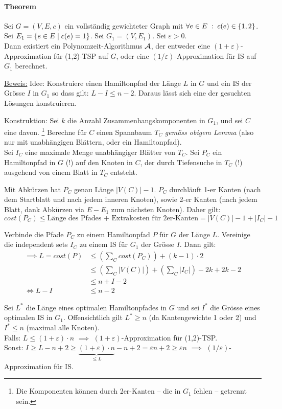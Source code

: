 \paragraph{Theorem}
Sei $G =(V,E,c)$ ein vollständig gewichteter Graph mit $\forall e \in E \; : \; c(e) \in \{1,2\}$.
Sei $E_1 = \{e \in E \; | \; c(e) = 1 \}$. Sei $G_1=(V,E_1)$.
Sei $\varepsilon > 0$.
\\
Dann existiert ein Polynomzeit-Algorithmus $\mathcal{A}$, der entweder eine $(1+\varepsilon)$-Approximation für (1,2)-TSP auf $G$,
oder eine $(1/\varepsilon)$-Approximation für IS auf $G_1$ berechnet.

\underline{Beweis:}
Idee: Konstruiere einen Hamiltonpfad der Länge $L$ in $G$ und ein IS der Grösse $I$ in $G_1$ so dass gilt: $L-I \leq n-2$.
Daraus lässt sich eine der gesuchten Lösungen konstruieren.

Konstruktion: Sei $k$ die Anzahl Zusammenhangskomponenten in $G_1$, und sei $C$ eine davon.%
\footnote{Die Komponenten können durch 2er-Kanten -- die in $G_1$ fehlen -- getrennt sein.}
Berechne für $C$ einen Spannbaum $T_C$ \emph{gemäss obigem Lemma} (also nur mit unabhängigen Blättern, oder ein Hamiltonpfad).
\\
Sei $I_C$ eine maximale Menge unabhängiger Blätter von $T_C$.
Sei $P_C$ ein Hamiltonpfad in $G$ (!) auf den Knoten in $C$, der durch Tiefensuche in $T_C$ (!) ausgehend
von einem Blatt in $T_C$ entsteht.

Mit Abkürzen hat $P_C$ genau Länge $|V(C)|-1$.
$P_C$ durchläuft 1-er Kanten (nach dem Startblatt und nach jedem inneren Knoten), sowie 2-er Kanten
(nach jedem Blatt, dank Abkürzen via $E-E_1$ zum nächsten Knoten).
Daher gilt:
$$ cost(P_C) \leq \text{Länge des Pfades + Extrakosten für 2er-Kanten} = |V(C)|-1 + |I_C|-1 $$

Verbinde die Pfade $P_C$ zu einem Hamiltonpfad $P$ für $G$ der Länge $L$.
Vereinige die independent sets $I_C$ zu einem IS für $G_1$ der Grösse $I$.
Dann gilt:
\begin{align*}
\implies L = cost(P)
& \leq \left( \sum_C cost(P_C) \right) + (k-1) \cdot 2 \\
& \leq \left( \sum_C |V(C)| \right) + \left( \sum_C |I_C| \right) - 2k + 2k - 2 \\
& \leq n + I - 2 \\
\iff L - I & \leq n-2
\end{align*}

Sei $L^*$ die Länge eines optimalen Hamiltonpfades in $G$ und sei $I^*$ die Grösse eines optimalen IS in $G_1$.
Offensichtlich gilt $L^* \geq n$ (da Kantengewichte 1 oder 2) und $I^* \leq n$ (maximal alle Knoten).
\\
Falls: $L \leq (1+\varepsilon) \cdot n$
$\implies$ $(1+\varepsilon)$-Approximation für (1,2)-TSP.
\\
Sonst: $I \geq L - n+2 \geq \underbrace{(1+\varepsilon) \cdot n}_{\leq L} - n+2 = \varepsilon n + 2 \geq \varepsilon n$
$\implies$ $(1/\varepsilon)$-Approximation für IS.

